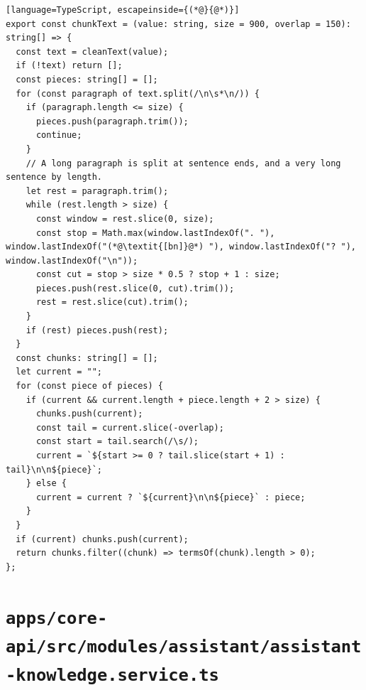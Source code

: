 \begin{lstlisting}[language=TypeScript, escapeinside={(*@}{@*)}]
export const chunkText = (value: string, size = 900, overlap = 150): string[] => {
  const text = cleanText(value);
  if (!text) return [];
  const pieces: string[] = [];
  for (const paragraph of text.split(/\n\s*\n/)) {
    if (paragraph.length <= size) {
      pieces.push(paragraph.trim());
      continue;
    }
    // A long paragraph is split at sentence ends, and a very long sentence by length.
    let rest = paragraph.trim();
    while (rest.length > size) {
      const window = rest.slice(0, size);
      const stop = Math.max(window.lastIndexOf(". "), window.lastIndexOf("(*@\textit{[bn]}@*) "), window.lastIndexOf("? "), window.lastIndexOf("\n"));
      const cut = stop > size * 0.5 ? stop + 1 : size;
      pieces.push(rest.slice(0, cut).trim());
      rest = rest.slice(cut).trim();
    }
    if (rest) pieces.push(rest);
  }
  const chunks: string[] = [];
  let current = "";
  for (const piece of pieces) {
    if (current && current.length + piece.length + 2 > size) {
      chunks.push(current);
      const tail = current.slice(-overlap);
      const start = tail.search(/\s/);
      current = `${start >= 0 ? tail.slice(start + 1) : tail}\n\n${piece}`;
    } else {
      current = current ? `${current}\n\n${piece}` : piece;
    }
  }
  if (current) chunks.push(current);
  return chunks.filter((chunk) => termsOf(chunk).length > 0);
};
\end{lstlisting}

\section*{\normalsize\nolinkurl{apps/core-api/src/modules/assistant/assistant-knowledge.service.ts}}

